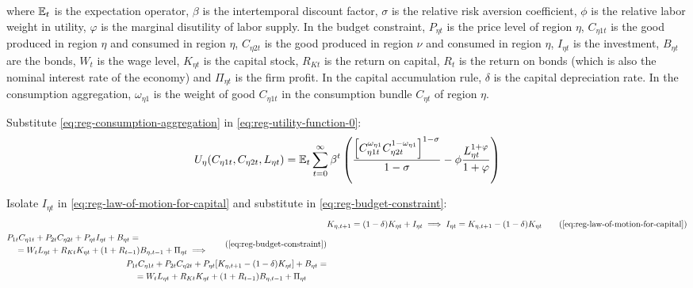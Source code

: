 \documentclass[../thesis.tex]{subfiles}
\begin{document}
where ${\mathbb{E}_{t}}$ is the expectation operator, $\beta$ is the intertemporal discount factor, $\sigma$ is the relative risk aversion coefficient, $\phi$ is the relative labor weight in utility, $\varphi$ is the marginal disutility of labor supply. In the budget constraint, $P_{\eta t}$ is the price level of region $\eta$, $C_{\eta 1 t}$ is the good produced in region $\eta$ and consumed in region $\eta$, $C_{\eta 2 t}$ is the good produced in region $\nu$ and consumed in region $\eta$, $I_{\eta t}$ is the investment, $B_{\eta t}$ are the bonds, $W_t$ is the wage level, $K_{\eta t}$ is the capital stock, $R_{Kt}$ is the return on capital, $R_t$ is the return on bonds (which is also the nominal interest rate of the economy) and $\Pi_{\eta t}$ is the firm profit. In the capital accumulation rule, $\delta$ is the capital depreciation rate. In the consumption aggregation, ${\omega_{\eta 1}}$ is the weight of good $C_{\eta 1 t}$ in the consumption bundle $C_{\eta t}$ of region $\eta$.

Substitute \ref{eq:reg-consumption-aggregation} in \ref{eq:reg-utility-function-0}:
\begin{align}
	U_{\eta}(C_{\eta 1 t}, C_{\eta 2 t}, L_{\eta t}) = {\mathbb{E}_{t}} \sum_{t=0}^{\infty} \beta^t \left( \frac{\left[ C_{\eta 1 t}^{\omega_{\eta 1}} C_{\eta 2 t}^{1-\omega_{\eta 1}} \right]^{1-\sigma}}{1-\sigma} - \phi \frac{L_{\eta t}^{1+\varphi}}{1+\varphi} \right) \label{eq:reg-utility-function}
\end{align}

Isolate $I_{\eta t}$ in \ref{eq:reg-law-of-motion-for-capital} and substitute in \ref{eq:reg-budget-constraint}:
\begin{align}
	& K_{\eta, t+1} = (1-\delta)K_{\eta t} + I_{\eta t} \implies I_{\eta t} = K_{\eta, t+1} - (1-\delta)K_{\eta t} \tag{\ref{eq:reg-law-of-motion-for-capital}} \\
	\begin{split}
		& P_{1 t} C_{\eta 1 t} + P_{2 t} C_{\eta 2 t} + P_{\eta t} I_{\eta t} + B_{\eta t} = \\ & \quad = W_t L_{\eta t} + R_{Kt} K_{\eta t} + (1 + R_{t-1}) B_{\eta,t-1} + \Pi_{\eta t} \implies
	\end{split} \tag{\ref{eq:reg-budget-constraint}}
	\\
	\begin{split}
		& P_{1 t} C_{\eta 1 t} + P_{2 t} C_{\eta 2 t} + P_{\eta t} [ K_{\eta, t+1} - (1-\delta)K_{\eta t} ] + B_{\eta t} = \\ & \quad = W_t L_{\eta t} + R_{Kt} K_{\eta t} + (1 + R_{t-1}) B_{\eta,t-1} + \Pi_{\eta t}
	\end{split} \label{eq:reg-budget-constraint-2}
\end{align}
\end{document}
